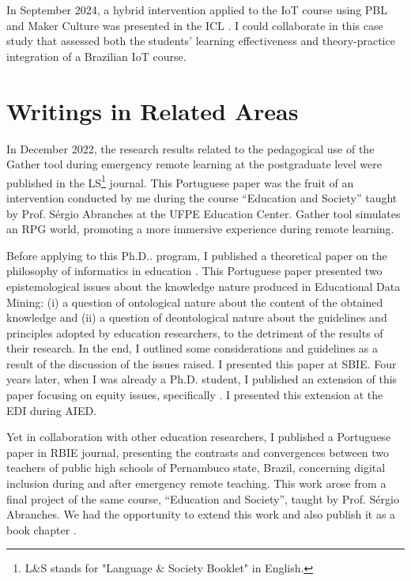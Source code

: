 In September 2024, a hybrid intervention applied to the \gls{IoT} course using \gls{PBL} and Maker Culture was presented in the \gls{ICL} \cite{cavalcanti:2024}. I could collaborate in this case study that assessed both the students' learning effectiveness and theory-practice integration of a Brazilian \gls{IoT} course.

\section{Writings in Related Areas}
\label{ap-other-writings:related-areas}

In December 2022, the research results related to the pedagogical use of the Gather tool during emergency remote learning at the postgraduate level were published in the \gls{LS}\footnote{L\&S stands for "Language \& Society Booklet" in English.} journal. This Portuguese paper \cite{lima:2022} was the fruit of an intervention conducted by me during the course “Education and Society” taught by Prof. Sérgio Abranches at the \gls{UFPE} Education Center. Gather tool simulates an \gls{RPG} world, promoting a more immersive experience during remote learning.

Before applying to this \gls{Ph.D.}. program, I published a theoretical paper on the philosophy of informatics in education \cite{bispojr:2019}. This Portuguese paper presented two epistemological issues about the knowledge nature produced in Educational Data Mining: (i) a question of ontological nature about the content of the obtained knowledge and (ii) a question of deontological nature about the guidelines and principles adopted by education researchers, to the detriment of the results of their research. In the end, I outlined some considerations and guidelines as a result of the discussion of the issues raised. I presented this paper at \gls{SBIE}. Four years later, when I was already a \gls{Ph.D.} student, I published an extension of this paper focusing on equity issues, specifically \cite{bispojr:2023-edi}. I presented this extension at the \gls{EDI} during \gls{AIED}.

Yet in collaboration with other education researchers, I published a Portuguese paper \cite{bispojr:2023-rbie} in \gls{RBIE} journal, presenting the contrasts and convergences between two teachers of public high schools of Pernambuco state, Brazil, concerning digital inclusion during and after emergency remote teaching. This work arose from a final project of the same course, “Education and Society”, taught by Prof. Sérgio Abranches. We had the opportunity to extend this work and also publish it as a book chapter \cite{sansil:2023}.


